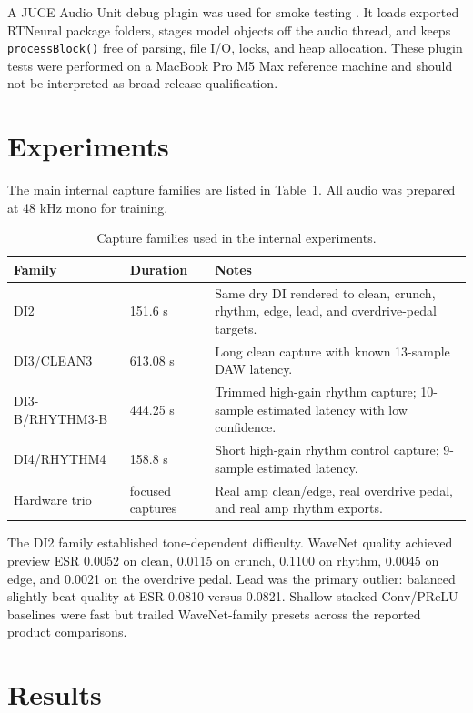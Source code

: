 \documentclass[11pt]{article}
\begin{document}
A JUCE Audio Unit debug plugin was used for smoke testing \cite{juce}. It
loads exported RTNeural package folders, stages model objects off the audio
thread, and keeps \texttt{processBlock()} free of parsing, file I/O, locks, and
heap allocation. These plugin tests were performed on a MacBook Pro M5 Max
reference machine and should not be interpreted as broad release qualification.

\section{Experiments}

The main internal capture families are listed in Table~\ref{tab:captures}. All
audio was prepared at 48 kHz mono for training.

\begin{table}[t]
\centering
\small
\begin{tabular}{@{}lp{3.0cm}p{6.6cm}@{}}
\toprule
Family & Duration & Notes \\
\midrule
DI2 & 151.6 s & Same dry DI rendered to clean, crunch, rhythm, edge, lead,
and overdrive-pedal targets. \\
DI3/CLEAN3 & 613.08 s & Long clean capture with known 13-sample DAW latency. \\
DI3-B/RHYTHM3-B & 444.25 s & Trimmed high-gain rhythm capture; 10-sample
estimated latency with low confidence. \\
DI4/RHYTHM4 & 158.8 s & Short high-gain rhythm control capture; 9-sample
estimated latency. \\
Hardware trio & focused captures & Real amp clean/edge, real overdrive pedal,
and real amp rhythm exports. \\
\bottomrule
\end{tabular}
\caption{Capture families used in the internal experiments.}
\label{tab:captures}
\end{table}

The DI2 family established tone-dependent difficulty. WaveNet quality achieved
preview ESR 0.0052 on clean, 0.0115 on crunch, 0.1100 on rhythm, 0.0045 on
edge, and 0.0021 on the overdrive pedal. Lead was the primary outlier:
balanced slightly beat quality at ESR 0.0810 versus 0.0821. Shallow stacked
Conv/PReLU baselines were fast but trailed WaveNet-family presets across the
reported product comparisons.

\section{Results}
\end{document}
